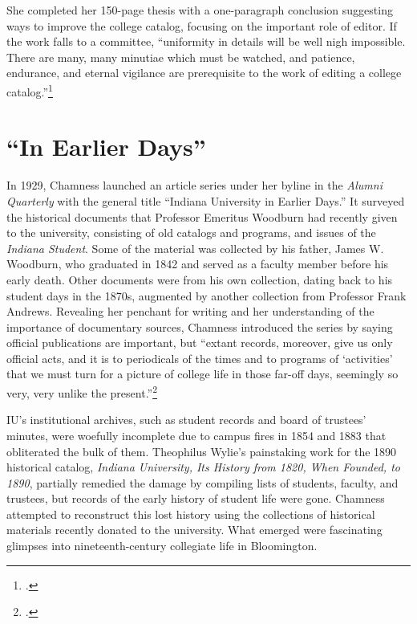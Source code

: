 \documentclass[
  american,
  letterpaper,
]{scrreprt}
\begin{document}
She completed her 150-page thesis with a one-paragraph conclusion
suggesting ways to improve the college catalog, focusing on the
important role of editor. If the work falls to a committee, ``uniformity
in details will be well nigh impossible. There are many, many minutiae
which must be watched, and patience, endurance, and eternal vigilance
are prerequisite to the work of editing a college catalog.''\footnote{.}

\section{``In Earlier Days''}\label{in-earlier-days}

In 1929, Chamness launched an article series under her byline in the
\emph{Alumni Quarterly} with the general title ``Indiana University in
Earlier Days.'' It surveyed the historical documents that Professor
Emeritus Woodburn had recently given to the university, consisting of
old catalogs and programs, and issues of the \emph{Indiana Student}.
Some of the material was collected by his father, James W. Woodburn, who
graduated in 1842 and served as a faculty member before his early death.
Other documents were from his own collection, dating back to his student
days in the 1870s, augmented by another collection from Professor Frank
Andrews. Revealing her penchant for writing and her understanding of the
importance of documentary sources, Chamness introduced the series by
saying official publications are important, but ``extant records,
moreover, give us only official acts, and it is to periodicals of the
times and to programs of `activities' that we must turn for a picture of
college life in those far-off days, seemingly so very, very unlike the
present.''\footnote{.}

IU's institutional archives, such as student records and board of
trustees' minutes, were woefully incomplete due to campus fires in 1854
and 1883 that obliterated the bulk of them. Theophilus Wylie's
painstaking work for the 1890 historical catalog, \emph{Indiana
University, Its History from 1820, When Founded, to 1890}, partially
remedied the damage by compiling lists of students, faculty, and
trustees, but records of the early history of student life were gone.
Chamness attempted to reconstruct this lost history using the
collections of historical materials recently donated to the university.
What emerged were fascinating glimpses into nineteenth-century
collegiate life in Bloomington.
\end{document}

